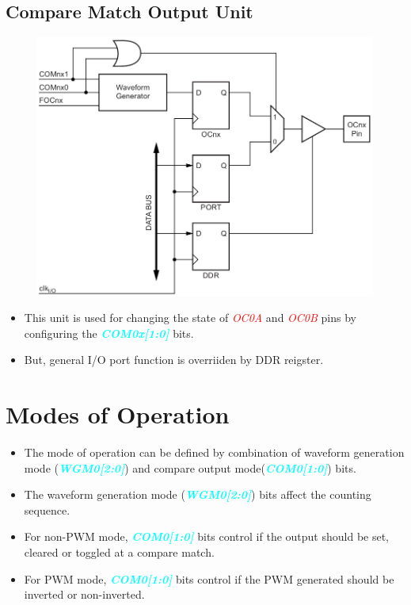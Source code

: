 \documentclass{article}
\newcommand{\bitFormat}[1]{\emph{\textbf{\textcolor{cyan}{#1}}}}
\newcommand{\pinFormat}[1]{\emph{\textcolor{red}{#1}}}
\begin{document}
\subsection{Compare Match Output Unit}
\begin{figure}[H]
    \begin{center}
        \includegraphics[height=0.3\textheight]{Timer0ComparteMatch.png}
    \end{center}
\end{figure}
\begin{itemize}
    \item This unit is used for changing the state of \pinFormat{OC0A} and \pinFormat{OC0B} pins by configuring the \bitFormat{COM0x[1:0]} bits.
    \item But, general I/O port function is overriiden by DDR reigster.
\end{itemize}

\section{Modes of Operation}
\begin{itemize}
    \item The mode of operation can be defined by combination of waveform generation mode (\bitFormat{WGM0[2:0]}) and compare output mode(\bitFormat{COM0[1:0]}) bits.
    \item The waveform generation mode (\bitFormat{WGM0[2:0]}) bits affect the counting sequence.
    \item For non-PWM mode, \bitFormat{COM0[1:0]} bits control if the output should be set, cleared or toggled at a compare match.
    \item For PWM mode, \bitFormat{COM0[1:0]} bits control if the PWM generated should be inverted or non-inverted.
\end{itemize}
\end{document}

